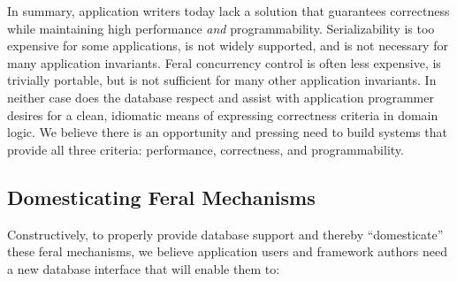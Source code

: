 In summary, application writers today lack a solution that guarantees
correctness while maintaining high performance \textit{and}
programmability. Serializability is too expensive for some
applications, is not widely supported, and is not necessary for many
application invariants. Feral concurrency control is often less
expensive, is trivially portable, but is not sufficient for many other
application invariants. In neither case does the database respect and
assist with application programmer desires for a clean, idiomatic
means of expressing correctness criteria in domain logic. We believe
there is an opportunity and pressing need to build systems that
provide all three criteria: performance, correctness, and
programmability.

\subsection{Domesticating Feral Mechanisms}

Constructively, to properly provide database support and thereby
``domesticate'' these feral mechanisms, we believe application users
and framework authors need a new database interface that will enable
them to:

